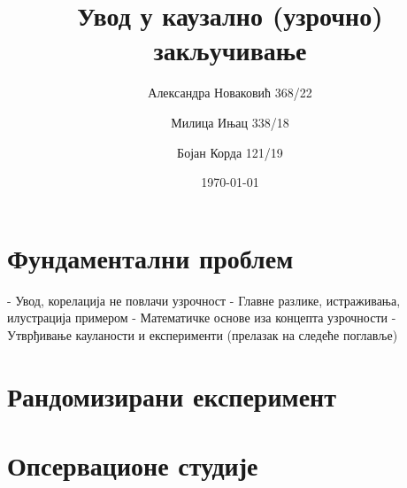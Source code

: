 \documentclass[12pt, a4paper]{article}
\title{Увод у каузално (узрочно) закључивање}
\author{Александра Новаковић 368/22}
\author{Милица Ињац 338/18}
\author{Бојан Корда 121/19}
\affil{Математички факултет, Универзитет у Београду}
\date{\today}
\begin{document}
\maketitle
\newpage

\tableofcontents
\newpage

\section{Фундаментални проблем}
- Увод, корелација не повлачи узрочност
- Главне разлике, истраживања, илустрација примером 
- Математичке основе иза концепта узрочности
- Утврђивање кауланости и експерименти (прелазак на следеће поглавље) 

\newpage



\section{Рандомизирани експеримент}
\newpage



\section{Опсервационе студије}
\end{document}
